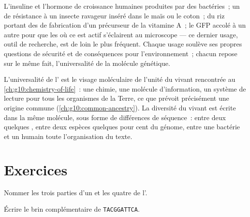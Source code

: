 \begin{example}\label{ex:g10:universal-dna:uses}
L'insuline et l'hormone de croissance humaines produites par des
bactéries~; un  de résistance à un insecte ravageur inséré dans le
maïs ou le coton~; du riz portant des  de fabrication d'un
précurseur de la vitamine A~; le  GFP accolé à un autre  pour
que les  où ce  est actif s'éclairent au microscope --- ce
dernier usage, outil de recherche, est de loin le plus fréquent. Chaque
usage soulève ses propres questions de sécurité et de conséquences pour
l'environnement~; chacun repose sur le même fait, l'universalité de la
molécule génétique.
\end{example}

\begin{remark}\label{rem:g10:universal-dna:unity}
L'universalité de l' est le visage moléculaire de l'unité du vivant
rencontrée au \cref{ch:g10:chemistry-of-life}~: une chimie, une
molécule d'information, un système de lecture pour tous les organismes
de la Terre, ce que prévoit précisément une origine commune
(\cref{ch:g10:common-ancestry}). La diversité du vivant est écrite dans
la même molécule, sous forme de différences de séquence~: entre deux
 quelques , entre deux espèces quelques pour cent du
génome, entre une bactérie et un humain toute l'organisation du texte.
\end{remark}

\section{Exercices}

\begin{exercise}[$\star$]\label{exo:g10:universal-dna:1}
Nommer les trois parties d'un  et les quatre  de l'.
\end{exercise}

\begin{exercise}[$\star$]\label{exo:g10:universal-dna:2}
Écrire le brin complémentaire de \texttt{TACGGATTCA}.
\end{exercise}

